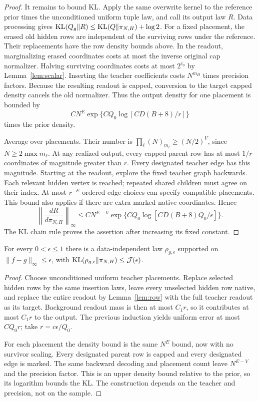 \begin{proof}
It remains to bound KL. Apply the same overwrite kernel to the reference prior times the unconditioned uniform tuple law, and call its output law $R$. Data processing gives
$\operatorname{KL}(Q_g\|R)\le\operatorname{KL}(Q\|\pi_{N,H})+\log2$.
For a fixed placement, the erased old hidden rows are independent of the surviving rows under the reference. Their replacements have the row density bounds above. In the readout, marginalizing erased coordinates costs at most the inverse original cap normalizer. Halving surviving coordinates costs at most $2^{c_0}$ by Lemma~\ref{lem:scalar}. Inserting the teacher coefficients costs $N^{m_H}$ times precision factors. Because the resulting readout is capped, conversion to the target capped density cancels the old normalizer. Thus the output density for one placement is bounded by
\[
 C N^E\exp\{CQ_0\log[CD(B+8)/r]\}
\]
times the prior density.

Average over placements. Their number is
$\prod_\ell(N)_{m_\ell}\ge(N/2)^V$, since $N\ge2\max m_\ell$.
At any realized output, every capped parent row has at most $1/r$ coordinates of magnitude greater than $r$. Every designated teacher edge has this magnitude. Starting at the readout, explore the fixed teacher graph backwards. Each relevant hidden vertex is reached; repeated shared children must agree on their index. At most $r^{-E}$ ordered edge choices can specify compatible placements. This bound also applies if there are extra marked native coordinates. Hence
\[
 \left\|\frac{dR}{d\pi_{N,H}}\right\|_\infty
 \le C N^{E-V}\exp\{CQ_0\log[CD(B+8)Q_0/\epsilon]\}.
\]
The KL chain rule proves the assertion after increasing its fixed constant.
\end{proof}

\begin{lemma}
\label{lem:localization}
For every $0<\epsilon\le1$ there is a data-independent law $\rho_{g,\epsilon}$ supported on $\|f-g\|_\infty\le\epsilon$, with
$\operatorname{KL}(\rho_{g,\epsilon}\|\pi_{N,H})\le\mathcal J(\epsilon)$.
\end{lemma}
\begin{proof}
Choose unconditioned uniform teacher placements. Replace selected hidden rows by the same insertion laws, leave every unselected hidden row native, and replace the entire readout by Lemma~\ref{lem:row} with the full teacher readout as its target. Background readout mass is then at most $C_1r$, so it contributes at most $C_1r$ to the output. The previous induction yields uniform error at most $CQ_0r$; take $r=c\epsilon/Q_0$.

For each placement the density bound is the same $N^E$ bound, now with no survivor scaling. Every designated parent row is capped and every designated edge is marked. The same backward decoding and placement count leave $N^{E-V}$ and the precision factor. This is an upper density bound relative to the prior, so its logarithm bounds the KL. The construction depends on the teacher and precision, not on the sample.
\end{proof}
